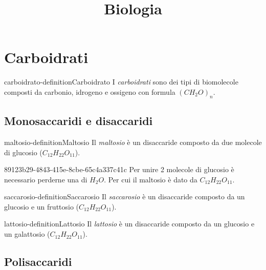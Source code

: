 \documentclass[preview]{standalone}
\begin{document}
\title{Biologia}
\genpage

\section{Carboidrati}

\begin{snippetdefinition}{carboidrato-definition}{Carboidrato}
    I \textit{carboidrati} sono dei tipi di biomolecole composti da carbonio, idrogeno e ossigeno
    con formula \((CH_2O)_n\).
\end{snippetdefinition}


\subsection{Monosaccaridi e disaccaridi}


\begin{snippetdefinition}{maltosio-definition}{Maltosio}
    Il \textit{maltosio} è un disaccaride composto da due molecole di glucosio (\(C_{12}H_{22}O_{11}\)).
\end{snippetdefinition}

\begin{snippet}{89123b29-4843-415e-8cbe-65c4a337c41c}
    Per unire 2 molecole di glucosio è necessario perderne una di \(H_2O\).
    Per cui il maltosio è dato da \(C_{12}H_{22}O_{11}\).
\end{snippet}

\begin{snippetdefinition}{saccarosio-definition}{Saccarosio}
    Il \textit{saccarosio} è un disaccaride composto da un glucosio e un fruttosio (\(C_{12}H_{22}O_{11}\)).
\end{snippetdefinition}

\begin{snippetdefinition}{lattosio-definition}{Lattosio}
    Il \textit{lattosio} è un disaccaride composto da un glucosio e un galattosio (\(C_{12}H_{22}O_{11}\)).
\end{snippetdefinition}

\subsection{Polisaccaridi}
\end{document}

